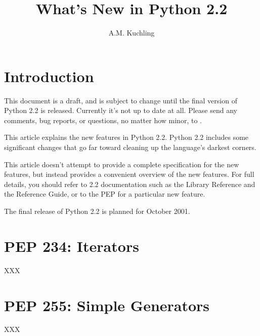 \documentclass{howto}
\title{What's New in Python 2.2}
\author{A.M. Kuchling}
\begin{document}
\maketitle\tableofcontents

\section{Introduction}

{\large This document is a draft, and is subject to change until the
final version of Python 2.2 is released.  Currently it's not up to
date at all.  Please send any comments, bug reports, or questions, no
matter how minor, to .  }

This article explains the new features in Python 2.2.  
Python 2.2 includes some significant changes that go far toward cleaning up
the language's darkest corners.

This article doesn't attempt to provide a complete specification for
the new features, but instead provides a convenient overview of the
new features.  For full details, you should refer to 2.2 documentation
such as the Library Reference and the Reference Guide, or to the PEP
for a particular new feature.

The final release of Python 2.2 is planned for October 2001.

\section{PEP 234: Iterators}

XXX

\begin{seealso}


\end{seealso}

\section{PEP 255: Simple Generators}

XXX

\begin{seealso}


\end{seealso}
\end{document}
